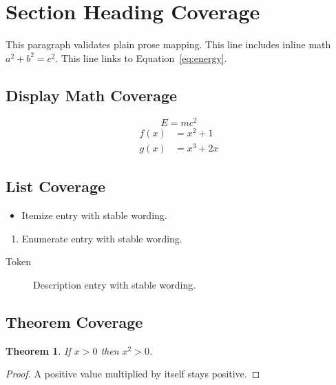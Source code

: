 \documentclass{article}
\newtheorem{theorem}{Theorem}
\begin{document}
\section{Section Heading Coverage} %
This paragraph validates plain prose mapping. %
This line includes inline math $a^2 + b^2 = c^2$. %
This line links to Equation~\ref{eq:energy}. %

\subsection{Display Math Coverage} %
\begin{equation}
E = m c^2 \label{eq:energy} %
\end{equation}
\begin{align}
f(x) &= x^2 + 1 \\
g(x) &= x^3 + 2x %
\end{align}

\subsection{List Coverage}
\begin{itemize}
\item Itemize entry with stable wording. %
\end{itemize}
\begin{enumerate}
\item Enumerate entry with stable wording. %
\end{enumerate}
\begin{description}
\item[Token] Description entry with stable wording. %
\end{description}

\subsection{Theorem Coverage}
\begin{theorem}
If $x > 0$ then $x^2 > 0$. %
\end{theorem}
\begin{proof}
A positive value multiplied by itself stays positive. %
\end{proof}
\end{document}

